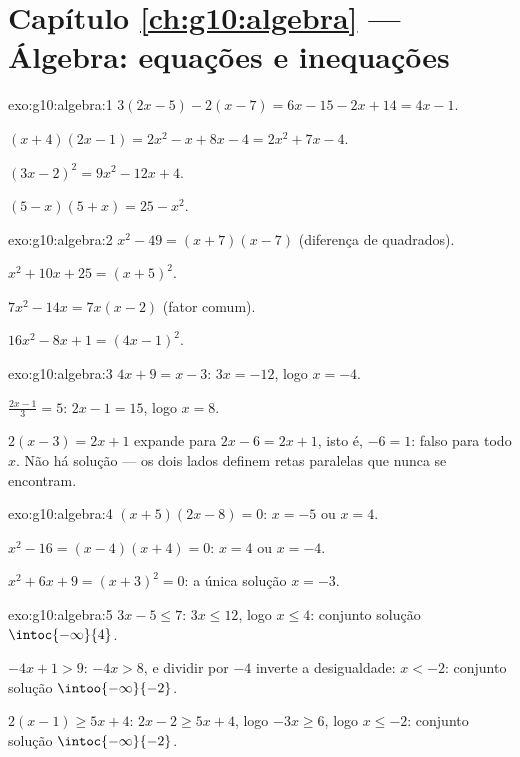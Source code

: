 \section*{Capítulo \ref{ch:g10:algebra} --- Álgebra: equações e inequações}

\begin{solution}{exo:g10:algebra:1}
$3(2x-5) - 2(x-7) = 6x - 15 - 2x + 14 = 4x - 1$.

$(x+4)(2x-1) = 2x^2 - x + 8x - 4 = 2x^2 + 7x - 4$.

$(3x-2)^2 = 9x^2 - 12x + 4$.

$(5-x)(5+x) = 25 - x^2$.
\end{solution}

\begin{solution}{exo:g10:algebra:2}
$x^2 - 49 = (x+7)(x-7)$ (diferença de quadrados).

$x^2 + 10x + 25 = (x+5)^2$.

$7x^2 - 14x = 7x(x - 2)$ (fator comum).

$16x^2 - 8x + 1 = (4x - 1)^2$.
\end{solution}

\begin{solution}{exo:g10:algebra:3}
$4x + 9 = x - 3$: $3x = -12$, logo $x = -4$.

$\frac{2x-1}{3} = 5$: $2x - 1 = 15$, logo $x = 8$.

$2(x-3) = 2x + 1$ expande para $2x - 6 = 2x + 1$, isto é, $-6 = 1$: falso
para todo $x$. Não há solução --- os dois lados definem retas paralelas
que nunca se encontram.
\end{solution}

\begin{solution}{exo:g10:algebra:4}
$(x+5)(2x-8) = 0$: $x = -5$ ou $x = 4$.

$x^2 - 16 = (x-4)(x+4) = 0$: $x = 4$ ou $x = -4$.

$x^2 + 6x + 9 = (x+3)^2 = 0$: a única solução $x = -3$.
\end{solution}

\begin{solution}{exo:g10:algebra:5}
$3x - 5 \leq 7$: $3x \leq 12$, logo $x \leq 4$: conjunto solução
$\intoc{-\infty}{4}$.

$-4x + 1 > 9$: $-4x > 8$, e dividir por $-4$ inverte a desigualdade:
$x < -2$: conjunto solução $\intoo{-\infty}{-2}$.

$2(x-1) \geq 5x + 4$: $2x - 2 \geq 5x + 4$, logo $-3x \geq 6$, logo
$x \leq -2$: conjunto solução $\intoc{-\infty}{-2}$.
\end{solution}

